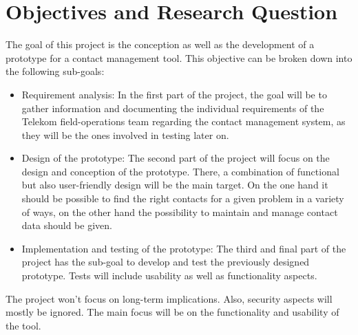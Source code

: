 \newpage
\section{Objectives and Research Question} 
The goal of this project is the conception as well as the development of a prototype for a  
contact management tool. This objective can be broken down into the following sub-goals:
\begin{itemize}
    \item Requirement analysis: In the first part of the project, the goal will be to gather 
    information and documenting the individual requirements of the Telekom field-operations 
    team regarding the contact management system, as they will be the ones involved in testing later on.  
    \item Design of the prototype: The second part of the project will focus on the design and 
    conception of the prototype. There, a combination of functional but also user-friendly design 
    will be the main target. On the one hand it should be possible to find the right contacts for a given
    problem in a variety of ways, on the other hand the possibility to maintain and manage contact data 
    should be given.
    \item Implementation and testing of the prototype: The third and final part of the project has
    the sub-goal to develop and test the previously designed prototype. Tests will include usability
    as well as functionality aspects.
\end{itemize}
The project won't focus on long-term implications. Also, security aspects will mostly be ignored. 
The main focus will be on the functionality and usability of the tool.
\\